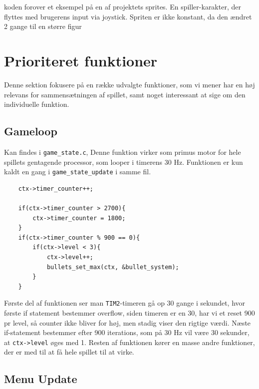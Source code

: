 koden forover et eksempel på en af projektets sprites. En spiller-karakter, der flyttes med brugerens input via joystick. Spriten er ikke konstant, da den ændret 2 gange til en større figur




\section{Prioriteret funktioner}
\vspace{0.5em}

Denne sektion fokusere på en række udvalgte funktioner, som vi mener har en høj relevans for sammensætningen af spillet, samt noget interessant at sige om den individuelle funktion.

\vspace{3pt}
\subsection{Gameloop}
\vspace{3pt}

Kan findes i \lstinline!game_state.c!, Denne funktion virker som primus motor for hele spillets gentagende processor, som looper i timerens 30 Hz. Funktionen er kun kaldt en gang i \lstinline!game_state_update! i samme fil. 

\vspace{1em}
\begin{lstlisting}
    ctx->timer_counter++;

    if(ctx->timer_counter > 2700){
        ctx->timer_counter = 1800;
    }
    if(ctx->timer_counter % 900 == 0){
        if(ctx->level < 3){
            ctx->level++;
            bullets_set_max(ctx, &bullet_system); 
        }
    }
\end{lstlisting}
\vspace{-2em}

Første del af funktionen ser man \lstinline!TIM2!-timeren gå op 30 gange i sekundet, hvor første if statement bestemmer overflow, siden timeren er en 30, har vi et reset 900 pr level, så counter ikke bliver for høj, men stadig viser den rigtige værdi. Næste if-statement bestemmer efter 900 iterations, som på 30 Hz vil være 30 sekunder, at \lstinline!ctx->level! øges med 1. Resten af funktionen kører en masse andre funktioner, der er med til at få hele spillet til at virke.

\vspace{3pt}
\subsection{Menu Update}
\vspace{3pt}

